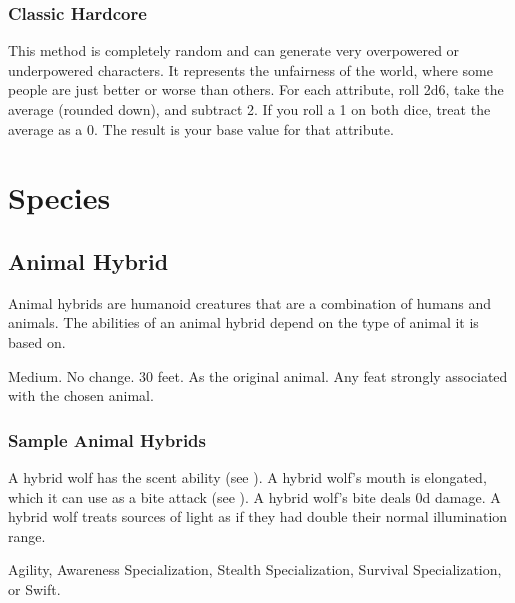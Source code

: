         \subsubsection{Classic Hardcore}

            This method is completely random and can generate very overpowered or underpowered characters.
            It represents the unfairness of the world, where some people are just better or worse than others.
            For each attribute, roll 2d6, take the average (rounded down), and subtract 2.
            If you roll a 1 on both dice, treat the average as a 0.
            The result is your base value for that attribute.

\section{Species}

    \subsection{Animal Hybrid}
        Animal hybrids are humanoid creatures that are a combination of humans and animals.
        The abilities of an animal hybrid depend on the type of animal it is based on.

         Medium.
         No change.
         30 feet.
         As the original animal.
         Any feat strongly associated with the chosen animal.

        \subsubsection{Sample Animal Hybrids}


            \begin{itemize}
                 A hybrid wolf has the scent ability (see ).
                 A hybrid wolf's mouth is elongated, which it can use as a bite attack (see ).
                    A hybrid wolf's bite deals \plus0d damage.
                 A hybrid wolf treats sources of light as if they had double their normal illumination range.
            \end{itemize}
         Agility, Awareness Specialization, Stealth Specialization, Survival Specialization, or Swift.

